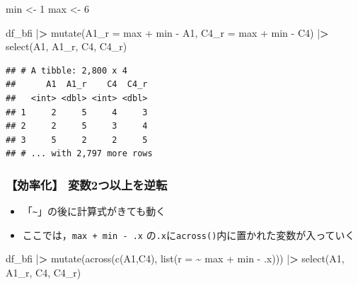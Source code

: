 \documentclass[
  xelatex,ja=standard, b5paper]{bxjsbook}
\newenvironment{Shaded}{\begin{snugshade}}{\end{snugshade}}
\newcommand{\AttributeTok}[1]{\textcolor[rgb]{0.77,0.63,0.00}{#1}}
\newcommand{\DecValTok}[1]{\textcolor[rgb]{0.00,0.00,0.81}{#1}}
\newcommand{\ErrorTok}[1]{\textcolor[rgb]{0.64,0.00,0.00}{\textbf{#1}}}
\newcommand{\FunctionTok}[1]{\textcolor[rgb]{0.00,0.00,0.00}{#1}}
\newcommand{\NormalTok}[1]{#1}
\newcommand{\OtherTok}[1]{\textcolor[rgb]{0.56,0.35,0.01}{#1}}
\newcommand{\SpecialCharTok}[1]{\textcolor[rgb]{0.00,0.00,0.00}{#1}}
\providecommand{\tightlist}{%
  \setlength{\itemsep}{0pt}\setlength{\parskip}{0pt}}
\begin{document}
\begin{Shaded}
\begin{Highlighting}[]
\NormalTok{min }\OtherTok{\textless{}{-}} \DecValTok{1}
\NormalTok{max }\OtherTok{\textless{}{-}} \DecValTok{6}

\NormalTok{df\_bfi }\SpecialCharTok{|}\ErrorTok{\textgreater{}} 
  \FunctionTok{mutate}\NormalTok{(}\AttributeTok{A1\_r =}\NormalTok{ max }\SpecialCharTok{+}\NormalTok{ min }\SpecialCharTok{{-}}\NormalTok{ A1,}
         \AttributeTok{C4\_r =}\NormalTok{ max }\SpecialCharTok{+}\NormalTok{ min }\SpecialCharTok{{-}}\NormalTok{ C4) }\SpecialCharTok{|}\ErrorTok{\textgreater{}} 
  \FunctionTok{select}\NormalTok{(A1, A1\_r, C4, C4\_r)}
\end{Highlighting}
\end{Shaded}

\begin{verbatim}
## # A tibble: 2,800 x 4
##      A1  A1_r    C4  C4_r
##   <int> <dbl> <int> <dbl>
## 1     2     5     4     3
## 2     2     5     3     4
## 3     5     2     2     5
## # ... with 2,797 more rows
\end{verbatim}

\hypertarget{mu-rev-rule2}{%
\subsubsection{【効率化】 変数2つ以上を逆転}\label{mu-rev-rule2}}

\begin{itemize}
\tightlist
\item
  「\texttt{\textasciitilde{}}」の後に計算式がきても動く
\item
  ここでは，\texttt{max\ +\ min\ -\ .x} の\texttt{.x}に\texttt{across()}内に置かれた変数が入っていく
\end{itemize}

\begin{Shaded}
\begin{Highlighting}[]
\NormalTok{df\_bfi }\SpecialCharTok{|}\ErrorTok{\textgreater{}} 
  \FunctionTok{mutate}\NormalTok{(}\FunctionTok{across}\NormalTok{(}\FunctionTok{c}\NormalTok{(A1,C4),}
                \FunctionTok{list}\NormalTok{(}\AttributeTok{r =} \SpecialCharTok{\textasciitilde{}}\NormalTok{ max }\SpecialCharTok{+}\NormalTok{ min }\SpecialCharTok{{-}}\NormalTok{ .x))) }\SpecialCharTok{|}\ErrorTok{\textgreater{}} 
  \FunctionTok{select}\NormalTok{(A1, A1\_r, C4, C4\_r)}
\end{Highlighting}
\end{Shaded}
\end{document}
